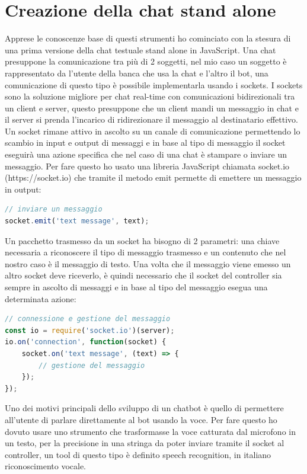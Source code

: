 \section{Creazione della chat stand alone}
Apprese le conoscenze base di questi strumenti ho cominciato con la stesura di una prima versione della chat testuale stand alone in JavaScript. Una chat presuppone la comunicazione tra più di 2 soggetti, nel mio caso un soggetto è rappresentato da l'utente della banca che usa la chat e l'altro il bot, una comunicazione di questo tipo è possibile implementarla usando i sockets.
I sockets sono la soluzione migliore per chat real-time con comunicazioni bidirezionali tra un client e server, questo presuppone che un client mandi un messaggio in chat e il server si prenda l'incarico di ridirezionare il messaggio al destinatario effettivo. Un socket rimane attivo in ascolto su un canale di comunicazione permettendo lo scambio in input e output di messaggi e in base al tipo di messaggio il socket eseguirà una azione specifica che nel caso di una chat è stampare o inviare un messaggio. Per fare questo ho usato una libreria JavaScript chiamata socket.io (https://socket.io) che tramite il metodo emit permette di emettere un messaggio in output:
\begin{lstlisting}[language=JavaScript]
// inviare un messaggio
socket.emit('text message', text);
\end{lstlisting}
Un pacchetto trasmesso da un socket ha bisogno di 2 parametri: una chiave necessaria a riconoscere il tipo di messaggio trasmesso e un contenuto che nel nostro caso è il messaggio di testo.
Una volta che il messaggio viene emesso un altro socket deve riceverlo, è quindi necessario che il socket del controller sia sempre in ascolto di messaggi e in base al tipo del messaggio esegua una determinata azione:
\begin{lstlisting}[language=JavaScript]
// connessione e gestione del messaggio
const io = require('socket.io')(server);
io.on('connection', function(socket) {
    socket.on('text message', (text) => {
        // gestione del messaggio
    });
});
\end{lstlisting}

Uno dei motivi principali dello sviluppo di un chatbot è quello di permettere all'utente di parlare direttamente al bot usando la voce. Per fare questo ho dovuto usare uno strumento che trasformasse la voce catturata dal microfono in un testo, per la precisione in una stringa da poter inviare tramite il socket al controller, un tool di questo tipo è definito speech recognition, in italiano riconoscimento vocale.
